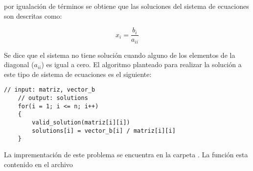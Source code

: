 por igualación de términos se obtiene que las soluciones del sistema de ecuaciones son descritas como:

\begin{equation*}
    x_i = \frac{b_i}{a_{ii}}
\end{equation*}

Se dice que el sistema no tiene solución cuando alguno de  los elementos de la diagonal ($a_{ii}$) es igual a cero.
El algoritmo planteado para realizar la solución a este tipo de sistema de ecuaciones es el siguiente:

\begin{lstlisting}[style=CStyle]
    // input: matriz, vector_b
    // output: solutions
    for(i = 1; i <= n; i++)
    {
        valid_solution(matriz[i][i])
        solutions[i] = vector_b[i] / matriz[i][i]
    }
\end{lstlisting}

La imprementación de este problema se encuentra en la carpeta . La función  esta contenido en el archivo 